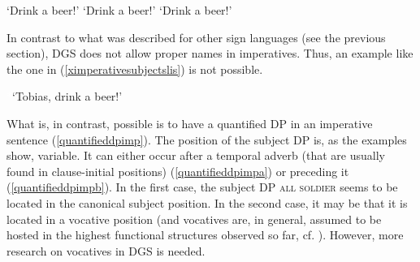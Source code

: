 \begin{exe}
\ex\label{imperativedgssimple}\begin{xlist} 
\ex {}
%
\glt `Drink a beer!' \label{imperativedgssimplea}
\ex {}
%
\glt `Drink a beer!' \label{imperativedgssimpleb}
\ex {}
%
\glt `Drink a beer!' \label{imperativedgssimpled}
\end{xlist}
\end{exe}

\noindent In contrast to what was described for other sign languages (see the previous section), DGS does not allow proper names in imperatives. Thus, an example like the one in (\ref{ximperativesubjectslis}) is not possible.


\begin{exe}
\ex *
\glt \textcolor{white}{*}`Tobias, drink a beer!' \label{ximperativesubjectslis}
\end{exe}

\noindent What is, in contrast, possible is to have a quantified DP in an imperative sentence (\ref{quantifieddpimp}). The position of the subject DP is, as the examples show, variable. It can either occur after a temporal adverb (that are usually found in clause-initial positions) (\ref{quantifieddpimpa}) or preceding it (\ref{quantifieddpimpb}). In the first case, the subject DP \textsc{all soldier} seems to be located in the canonical subject position. In the second case, it may be that it is located in a vocative position (and vocatives are, in general, assumed to be hosted in the highest functional structures observed so far, cf. \citealt{moro2003notes, hill2007vocatives, hill2013vocatives}). However, more research on vocatives in DGS is needed. 

